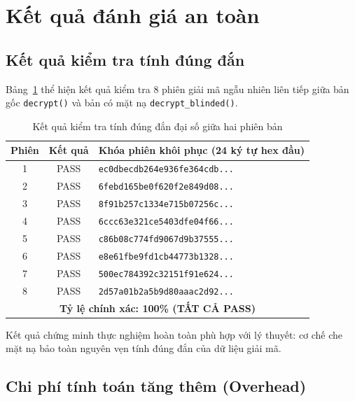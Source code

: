 \documentclass[../LuanVan.tex]{subfiles}
\begin{document}
\section{Kết quả đánh giá an toàn}
\label{sec:ketqua}

\subsection{Kết quả kiểm tra tính đúng đắn}

Bảng~\ref{tab:verify} thể hiện kết quả kiểm tra 8 phiên giải mã ngẫu nhiên liên tiếp giữa bản gốc \texttt{decrypt()} và bản có mặt nạ \texttt{decrypt\_blinded()}.

\begin{table}[H]
\centering
\caption{Kết quả kiểm tra tính đúng đắn đại số giữa hai phiên bản}
\label{tab:verify}
\begin{tabular}{c c l}
\toprule
\textbf{Phiên} & \textbf{Kết quả} & \textbf{Khóa phiên khôi phục (24 ký tự hex đầu)} \\
\midrule
1 & PASS & \texttt{ec0dbecdb264e936fe364cdb...} \\
2 & PASS & \texttt{6febd165be0f620f2e849d08...} \\
3 & PASS & \texttt{8f91b257c1334e715b07256c...} \\
4 & PASS & \texttt{6ccc63e321ce5403dfe04f66...} \\
5 & PASS & \texttt{c86b08c774fd9067d9b37555...} \\
6 & PASS & \texttt{e8e61fbe9fd1cb44773b1328...} \\
7 & PASS & \texttt{500ec784392c32151f91e624...} \\
8 & PASS & \texttt{2d57a01b2a5b9d80aaac2d92...} \\
\midrule
\multicolumn{3}{c}{\textbf{Tỷ lệ chính xác: 100\% (TẤT CẢ PASS)}} \\
\bottomrule
\end{tabular}
\end{table}

Kết quả chứng minh thực nghiệm hoàn toàn phù hợp với lý thuyết: cơ chế che mặt nạ bảo toàn nguyên vẹn tính đúng đắn của dữ liệu giải mã.

\subsection{Chi phí tính toán tăng thêm (Overhead)}
\end{document}
